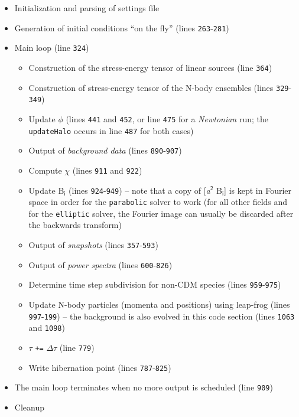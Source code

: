 \documentclass[a4paper,10pt]{article}
\begin{document}
\begin{itemize}
 \item Initialization and parsing of settings file
 \item Generation of initial conditions ``on the fly'' (lines \texttt{263}-\texttt{281})
 \item Main loop (line \texttt{324})
\begin{itemize}
 \item Construction of the stress-energy tensor of linear sources (line \texttt{364})
 \item Construction of stress-energy tensor of the N-body ensembles (lines \texttt{329}-\texttt{349})
 \item Update $\mathsf{\phi}$ (lines \texttt{441} and \texttt{452}, or line \texttt{475} for a \textit{Newtonian} run; the \texttt{updateHalo} occurs in line
\texttt{487} for both cases)
 \item Output of \textit{background data} (lines \texttt{890}-\texttt{907})
 \item Compute $\mathsf{\chi}$ (lines \texttt{911} and \texttt{922})
 \item Update B$_\mathsf{i}$ (lines \texttt{924}-\texttt{949}) -- note that a copy of [\textit{a}$^\mathsf{2}$ B$_\mathsf{i}$] is kept in Fourier space in order for the \texttt{parabolic} solver to work (for all other fields and for the \texttt{elliptic} solver, the Fourier image can usually be discarded after the backwards transform)
 \item Output of \textit{snapshots} (lines \texttt{357}-\texttt{593})
 \item Output of \textit{power spectra} (lines \texttt{600}-\texttt{826})
 \item Determine time step subdivision for non-CDM species (lines \texttt{959}-\texttt{975})
 \item Update N-body particles (momenta and positions) using leap-frog (lines \texttt{997}-\texttt{199}) -- the background is also evolved in this code section (lines \texttt{1063} and \texttt{1098})
 \item $\mathsf{\tau}$ \texttt{+=} $\mathsf{\Delta\tau}$ (line \texttt{779})
 \item Write hibernation point (lines \texttt{787}-\texttt{825})
\end{itemize}
\item The main loop terminates when no more output is scheduled (line \texttt{909})
 \item Cleanup
\end{itemize}
\end{document}
